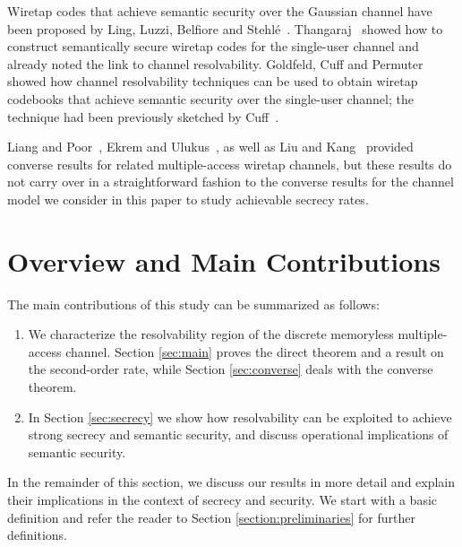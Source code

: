 \documentclass[journal]{IEEEtran}
\begin{document}
Wiretap codes that achieve semantic security over the Gaussian channel
have been proposed by Ling, Luzzi, Belfiore and
Stehlé~\cite{LingSemantically}. Thangaraj~\cite{ThangarajCoding}
showed how to construct semantically secure wiretap codes for the
single-user channel and already noted the link to channel
resolvability. Goldfeld, Cuff and
Permuter~\cite{GoldfeldSemantic}\cite{GoldfeldSemanticConference}
showed how channel resolvability techniques can be used to obtain
wiretap codebooks that achieve semantic security over the single-user
channel; the technique had been previously sketched by
Cuff~\cite{CuffStronger}.

Liang and Poor~\cite{LiangPoorMACConfidential}, Ekrem and
Ulukus~\cite{EkremUlukusSecrecyMAC}, as well as Liu and
Kang~\cite{LiuKangSecrecyCapacity} provided converse results for
related multiple-access wiretap channels, but these results do not
carry over in a straightforward fashion to the converse results for
the channel model we consider in this paper to study achievable
secrecy rates.


\section{Overview and Main Contributions}
\label{sec:maincontributions}

The main contributions of this study can be summarized as follows:
\begin{enumerate}
\item We characterize the resolvability region of the discrete
  memoryless multiple-access channel. Section \ref{sec:main} proves
  the direct theorem and a result on the second-order rate, while
  Section \ref{sec:converse} deals with the converse theorem.
\item In Section \ref{sec:secrecy} we show how resolvability can be
  exploited to achieve strong secrecy and semantic security, and
  discuss operational implications of semantic security.
\end{enumerate}

In the remainder of this section, we discuss our results in more
detail and explain their implications in the context of secrecy and
security. We start with a basic definition and refer the reader to
Section \ref{section:preliminaries} for further definitions.
\end{document}
